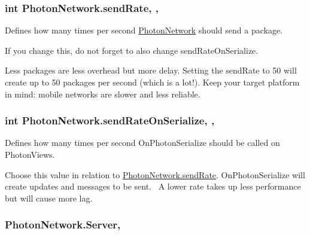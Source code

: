 \subsubsection[{\texorpdfstring{send\+Rate}{sendRate}}]{\setlength{\rightskip}{0pt plus 5cm}int Photon\+Network.\+send\+Rate\hspace{0.3cm}{\ttfamily [static]}, {\ttfamily [get]}, {\ttfamily [set]}}\hypertarget{class_photon_network_a154fc601fac7f0fddd704231189457fb}{}\label{class_photon_network_a154fc601fac7f0fddd704231189457fb}


Defines how many times per second \hyperlink{class_photon_network}{Photon\+Network} should send a package. 

If you change this, do not forget to also change \textquotesingle{}send\+Rate\+On\+Serialize\textquotesingle{}. 

Less packages are less overhead but more delay. Setting the send\+Rate to 50 will create up to 50 packages per second (which is a lot!). Keep your target platform in mind\+: mobile networks are slower and less reliable. 
\subsubsection[{\texorpdfstring{send\+Rate\+On\+Serialize}{sendRateOnSerialize}}]{\setlength{\rightskip}{0pt plus 5cm}int Photon\+Network.\+send\+Rate\+On\+Serialize\hspace{0.3cm}{\ttfamily [static]}, {\ttfamily [get]}, {\ttfamily [set]}}\hypertarget{class_photon_network_ac23d14ad150a87d51f4ffaa286db29e1}{}\label{class_photon_network_ac23d14ad150a87d51f4ffaa286db29e1}


Defines how many times per second On\+Photon\+Serialize should be called on Photon\+Views. 

Choose this value in relation to \hyperlink{class_photon_network_a154fc601fac7f0fddd704231189457fb}{Photon\+Network.\+send\+Rate}. On\+Photon\+Serialize will create updates and messages to be sent.~\newline
 A lower rate takes up less performance but will cause more lag. 
\subsubsection[{\texorpdfstring{Server}{Server}}]{ Photon\+Network.\+Server\hspace{0.3cm}{\ttfamily [static]}, {\ttfamily [get]}}\hypertarget{class_photon_network_a9225b990f7b3d0fffadc23c7b3118ef2}{}\label{class_photon_network_a9225b990f7b3d0fffadc23c7b3118ef2}


